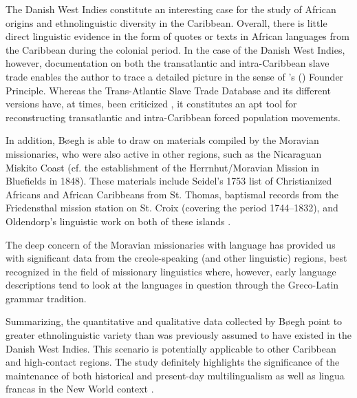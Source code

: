\documentclass[output=paper,colorlinks,citecolor=brown]{langscibook}
\begin{document}
The Danish West Indies constitute an interesting case for the study of African origins and ethnolinguistic diversity in the Caribbean. Overall, there is little direct linguistic evidence in the form of quotes or texts in African languages from the Caribbean during the colonial period. In the case of the Danish West Indies, however, documentation on both the transatlantic and intra-Caribbean slave trade enables the author to trace a detailed picture in the sense of \citeauthor{Mufwene_1996}’s (\citeyear{Mufwene_1996}) Founder Principle. Whereas the Trans-Atlantic Slave Trade Database and its different versions have, at times, been criticized  \citep[cf.][]{Inikori_2011}, it constitutes an apt tool for reconstructing transatlantic and intra-Caribbean forced population movements. 

In addition, Bøegh is able to draw on materials compiled by the Moravian missionaries, who were also active in other regions, such as the Nicaraguan Miskito Coast (cf. the establishment of the Herrnhut/Moravian Mission in Bluefields in 1848). These materials include Seidel’s 1753 list of Christianized Africans and African Caribbeans from St. Thomas, baptismal records from the Friedensthal mission station on St. Croix (covering the period 1744–1832), and Oldendorp’s linguistic work on both of these islands \citep{Oldendorp_1777,Oldendorp_2000,Pope_1970,Seidel_1753}.

The deep concern of the Moravian missionaries with language \citep[cf.][17--20]{Holm_1989} has provided us with significant data from the creole-speaking (and other linguistic) regions, best recognized in the field of missionary linguistics where, however, early language descriptions tend to look at the languages in question through the Greco-Latin grammar tradition.

Summarizing, the quantitative and qualitative data collected by Bøegh point to greater ethnolinguistic variety than was previously assumed to have existed in the Danish West Indies. This scenario is potentially applicable to other Caribbean and high-contact regions. The study definitely highlights the significance of the maintenance of both historical and present-day multilingualism as well as lingua francas in the New World context \citep[cf.][]{AlvarezLopez_2004,Palmie_2006}.
\end{document}
